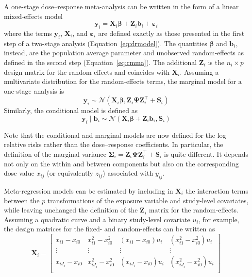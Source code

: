 \documentclass[11pt,a4paper,twoside,openany]{book}\usepackage{knitr}
\begin{document}
{{A one-stage dose--response meta-analysis can be written in the form of a linear mixed-effects model
\begin{equation}
\mathbf{y}_{i} = \mathbf{X}_{i} \boldsymbol{\beta} + \mathbf{Z}_{i}  \mathbf{b}_i + \boldsymbol{\varepsilon}_{i}
\label{eq:onestage}
\end{equation}
\noindent where the terms $\mathbf{y}_{i}$, $\mathbf{X}_{i}$, and $\boldsymbol{\varepsilon}_{i}$ are defined exactly as those presented in the first step of a two-stage analysis (Equation~\ref{eq:drmodel}). The quantities $\boldsymbol{\beta}$ and $\mathbf{b}_i$, instead, are the population average parameter and unobserved random-effects as defined in the second step (Equation~\ref{eq:rmma}). The additional $\mathbf{Z}_{i}$ is the $n_i \times p$ design matrix for the random-effects and coincides with $\mathbf{X}_{i}$.
Assuming a multivariate distribution for the random-effects terms, the marginal model for a one-stage analysis is
\begin{equation}
\mathbf{y}_{i} \sim \mathcal{N} \left( \mathbf{X}_{i} \boldsymbol{\beta},  \mathbf{Z}_{i} \boldsymbol{\Psi} \mathbf{Z}_{i}^\top  + \mathbf{S}_i \right)
\label{eq:marginal_os}
\end{equation}
\noindent Similarly, the conditional model is defined as
\begin{equation}
\mathbf{y}_{i} \mid \boldsymbol{b}_i \sim \mathcal{N} \left( \mathbf{X}_{i} \boldsymbol{\beta} + \mathbf{Z}_{i} \boldsymbol{b}_i,  \mathbf{S}_i \right)
\label{eq:conditional_os}
\end{equation}

\noindent Note that the conditional and marginal models are now defined for the log relative risks rather than the dose--response coefficients. In particular, the definition of the marginal variance $\boldsymbol{\Sigma}_i  = \mathbf{Z}_{i} \boldsymbol{\Psi} \mathbf{Z}_{i}^\top  + \mathbf{S}_i$ is quite different. It depends not only on the within and between components but also on the corresponding dose value $x_{ij}$ (or equivalently $z_{ij}$) associated with $y_{ij}$.

Meta-regression models can be estimated by including in $\mathbf{X}_{i}$ the interaction terms between the $p$ transformations of the exposure variable and study-level covariates, while leaving unchanged the definition of the $\mathbf{Z}_{i}$ matrix for the random-effects. Assuming a quadratic curve and a binary study-level covariate $u_i$, for example, the design matrices for the fixed- and random-effects can be written as
\begin{equation*}
\mathbf{X}_i =
	\begin{bmatrix}
		x_{i1} - x_{i0}  & x_{i1}^2 - x_{i0}^2 & \left(x_{i1} - x_{i0}\right) u_i &  \left( x_{i1}^2 - x_{i0}^2\right) u_i \\
		\vdots & \vdots & \vdots & \vdots \\
		x_{iJ_i} - x_{i0}  & x_{iJ_i}^2 - x_{i0}^2 & \left(x_{iJ_i} - x_{i0}\right) u_i  & \left(x_{iJ_i}^2 - x_{i0}^2\right) u_i \\
	\end{bmatrix}
\end{equation*} 

}}
\end{document}
